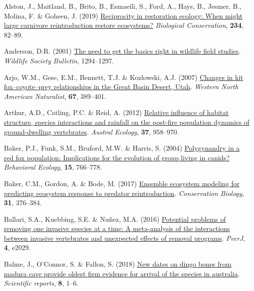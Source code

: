 \documentclass[11pt,a4paper,titlepage,twoside,openright]{style/unimelbthesis}
\newenvironment{CSLReferences}%
  {}%
  {\par}
\begin{document}
\begin{mainmatter}
\begin{CSLReferences}{1}{0}
\leavevmode{}%
Alston, J., Maitland, B., Brito, B., Esmaeili, S., Ford, A., Hays, B., Jesmer, B., Molina, F. \& Goheen, J. (2019) \href{https://doi.org/10.1016/j.biocon.2019.03.021}{Reciprocity in restoration ecology: When might large carnivore reintroduction restore ecosystems?} \emph{Biological Conservation}, \textbf{234}, 82--89.

\leavevmode{}%
Anderson, D.R. (2001) \href{https://doi.org/10.2307/3784156}{The need to get the basics right in wildlife field studies}. \emph{Wildlife Society Bulletin}, 1294--1297.

\leavevmode{}%
Arjo, W.M., Gese, E.M., Bennett, T.J. \& Kozlowski, A.J. (2007) \href{https://doi.org/10.3398/1527-0904(2007)67\%5B389:CIKFRI\%5D2.0.CO;2}{{Changes in kit fox--coyote--prey relationships in the Great Basin Desert, Utah}}. \emph{Western North American Naturalist}, \textbf{67}, 389--401.

\leavevmode{}%
Arthur, A.D., Catling, P.C. \& Reid, A. (2012) \href{https://doi.org/10.1111/j.1442-9993.2011.02355.x}{Relative influence of habitat structure, species interactions and rainfall on the post-fire population dynamics of ground-dwelling vertebrates}. \emph{Austral Ecology}, \textbf{37}, 958--970.

\leavevmode{}%
Baker, P.J., Funk, S.M., Bruford, M.W. \& Harris, S. (2004) \href{https://doi.org/10.1093/beheco/arh077}{Polygynandry in a red fox population: Implications for the evolution of group living in canids?} \emph{Behavioral Ecology}, \textbf{15}, 766--778.

\leavevmode{}%
Baker, C.M., Gordon, A. \& Bode, M. (2017) \href{https://doi.org/10.1111/cobi.12798}{Ensemble ecosystem modeling for predicting ecosystem response to predator reintroduction}. \emph{Conservation Biology}, \textbf{31}, 376--384.

\leavevmode{}%
Ballari, S.A., Kuebbing, S.E. \& Nuñez, M.A. (2016) \href{https://doi.org/10.7717/peerj.2029}{Potential problems of removing one invasive species at a time: A meta-analysis of the interactions between invasive vertebrates and unexpected effects of removal programs}. \emph{PeerJ}, \textbf{4}, e2029.

\leavevmode{}%
Balme, J., O'Connor, S. \& Fallon, S. (2018) \href{https://doi.org/10.1038/s41598-018-28324-x}{New dates on dingo bones from madura cave provide oldest firm evidence for arrival of the species in australia}. \emph{Scientific reports}, \textbf{8}, 1--6.


\end{CSLReferences}
\end{mainmatter}
\end{document}

